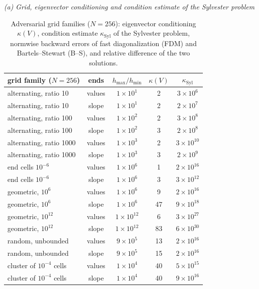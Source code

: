 \begin{table}[htbp]\centering\small
\caption{Adversarial grid families ($N=256$): eigenvector conditioning $\kappa(V)$, condition estimate
$\kappa_{\mathrm{Syl}}$ of the Sylvester problem, normwise backward errors of fast diagonalization (FDM) and
Bartels--Stewart (B--S), and relative difference of the two solutions.}
\textit{(a) Grid, eigenvector conditioning and condition estimate of the Sylvester problem}\\[2pt]
\begin{tabular}{>{\raggedright\arraybackslash}p{}c c c c}
\toprule
grid family ($N=256$) & ends & $h_{\max}/h_{\min}$ & $\kappa(V)$ & $\kappa_{\mathrm{Syl}}$\\
\midrule
alternating, ratio 10 & values & $1{\times}10^{1}$ & 2 & $3{\times}10^{6}$\\
alternating, ratio 10 & slope & $1{\times}10^{1}$ & 2 & $2{\times}10^{7}$\\
alternating, ratio 100 & values & $1{\times}10^{2}$ & 2 & $3{\times}10^{8}$\\
alternating, ratio 100 & slope & $1{\times}10^{2}$ & 3 & $2{\times}10^{8}$\\
alternating, ratio 1000 & values & $1{\times}10^{3}$ & 2 & $3{\times}10^{10}$\\
alternating, ratio 1000 & slope & $1{\times}10^{3}$ & 3 & $2{\times}10^{9}$\\
end cells $10^{-6}$ & values & $1{\times}10^{6}$ & 1 & $2{\times}10^{16}$\\
end cells $10^{-6}$ & slope & $1{\times}10^{6}$ & 3 & $3{\times}10^{12}$\\
geometric, $10^6$ & values & $1{\times}10^{6}$ & 9 & $2{\times}10^{16}$\\
geometric, $10^6$ & slope & $1{\times}10^{6}$ & 47 & $9{\times}10^{18}$\\
geometric, $10^{12}$ & values & $1{\times}10^{12}$ & 6 & $3{\times}10^{27}$\\
geometric, $10^{12}$ & slope & $1{\times}10^{12}$ & 83 & $6{\times}10^{30}$\\
random, unbounded & values & $9{\times}10^{5}$ & 13 & $2{\times}10^{16}$\\
random, unbounded & slope & $9{\times}10^{5}$ & 15 & $2{\times}10^{16}$\\
cluster of $10^{-4}$ cells & values & $1{\times}10^{4}$ & 40 & $5{\times}10^{15}$\\
cluster of $10^{-4}$ cells & slope & $1{\times}10^{4}$ & 40 & $9{\times}10^{16}$\\
\bottomrule
\end{tabular}


\end{table}
